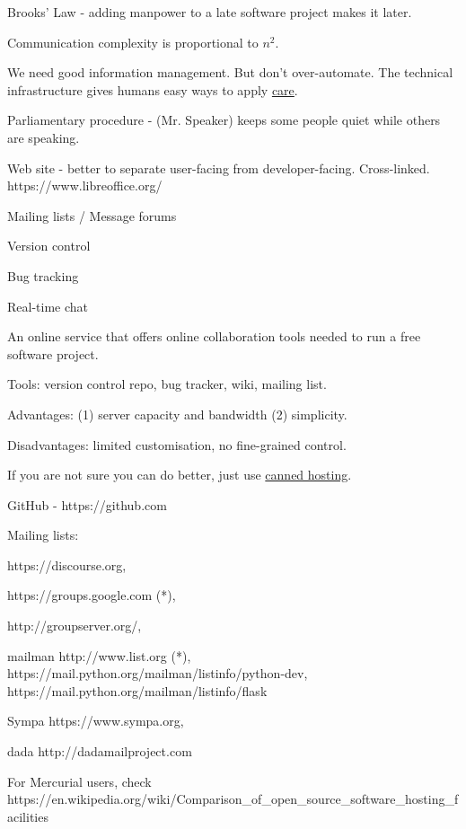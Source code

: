 \documentclass[landscape,30pt]{foils}
\begin{document}

Brooks' Law - adding manpower to a late software project makes it later. 

Communication complexity is proportional to $n^2$.

We need good information management.  But don't over-automate. The technical infrastructure gives humans easy ways to apply \underline{care}.

Parliamentary procedure -  (Mr. Speaker) keeps some people quiet while others are speaking.


Web site - better to separate user-facing from developer-facing. Cross-linked.  https://www.libreoffice.org/

Mailing lists / Message forums

Version control

Bug tracking

Real-time chat



An online service that offers online collaboration tools needed to run a free software project.

Tools: version control repo, bug tracker,  wiki, mailing list.

Advantages:  (1) server capacity and bandwidth (2) simplicity.

Disadvantages: limited customisation, no fine-grained control.
 
If you are not sure you can do better, just use \underline{canned hosting}.

GitHub - https://github.com

Mailing lists:

https://discourse.org,

https://groups.google.com (*),

http://groupserver.org/,

mailman http://www.list.org (*),  https://mail.python.org/mailman/listinfo/python-dev, https://mail.python.org/mailman/listinfo/flask

Sympa https://www.sympa.org,

dada http://dadamailproject.com

For Mercurial users, check https://en.wikipedia.org/wiki/Comparison\_of\_open\_source\_software\_hosting\_facilities
\end{document}
